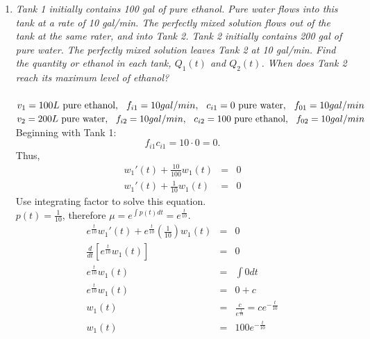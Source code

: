 \documentclass[10pt]{article}
\begin{document}
\begin{enumerate}
            \item {\it Tank 1 initially contains 100 gal of pure ethanol. Pure water flows into this tank at a rate of 10 gal/min. The perfectly mixed solution flows out of the tank at the same rater, and into Tank 2. Tank 2 initially contains 200 gal of pure water. The perfectly mixed solution leaves Tank 2 at 10 gal/min. Find the quantity or ethanol in each tank, $Q_1(t)$ and $Q_2(t)$. When does Tank 2 reach its maximum level of ethanol?}\\ \\
            $v_1=100 L\text{  pure ethanol},\hspace{.25cm} f_{i1}=10 gal/min,\hspace{.25cm} c_{i1}=0\text{  pure water},\hspace{.25cm} f_{01}=10 gal/min$\\
            $v_2=200 L\text{  pure water},\hspace{.25cm} f_{i2}=10 gal/min,\hspace{.25cm} c_{i2}=100\text{  pure ethanol},\hspace{.25cm} f_{02}=10 gal/min$\\
            Beginning with Tank 1: $$f_{i1}c_{i1}=10\cdot0 = 0.$$
            Thus,
            \begin{eqnarray*}
                w_1'(t)+\frac{10}{100}w_1(t)&=&0\\
                w_1'(t)+\frac{1}{10}w_1(t)&=&0
            \end{eqnarray*}
            Use integrating factor to solve this equation.\\
            $p(t)=\frac{1}{10}$, therefore $\mu=e^{\int p(t)dt}=e^{\frac{t}{10}}$.
            \begin{eqnarray*}
            e^{\frac{t}{10}}w_1'(t)+e^{\frac{t}{10}}(\frac{1}{10})w_1(t)&=&0\\
            \frac{d}{dt}[e^{\frac{t}{10}}w_1(t)]&=&0\\
            e^{\frac{t}{10}}w_1(t)&=&\int{0dt}\\
            e^{\frac{t}{10}}w_1(t)&=&0+c\\
            w_1(t)&=&\frac{c}{e^{\frac{t}{10}}} =ce^{-\frac{t}{10}}\\
            w_1(t)&=&100e^{-\frac{t}{10}}
            \end{eqnarray*}
            

\end{enumerate}
\end{document}
